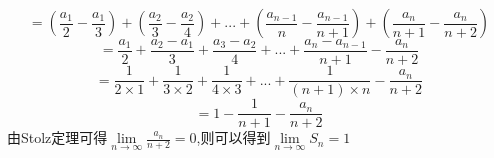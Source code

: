 \documentclass[UTF8,a4paper,10pt]{ctexart}
\begin{document}
\begin{flushleft}
\begin{enumerate}
				\begin{equation}
					=(\frac{a_{1}}{2}-\frac{a_{1}}{3})+(\frac{a_{2}}{3}-\frac{a_{2}}{4})+...+(\frac{a_{n-1}}{n}-\frac{a_{n-1}}{n+1})+(\frac{a_{n}}{n+1}-\frac{a_{n}}{n+2})\nonumber
				\end{equation}
				\begin{equation}
					=\frac{a_{1}}{2}+\frac{a_{2}-a_{1}}{3}+\frac{a_{3}-a_{2}}{4}+...+\frac{a_{n}-a_{n-1}}{n+1}-\frac{a_{n}}{n+2}\nonumber
				\end{equation}
				\begin{equation}
					=\frac{1}{2\times{1}}+\frac{1}{3\times{2}}+\frac{1}{4\times{3}}+...+\frac{1}{(n+1)\times{n}}-\frac{a_{n}}{n+2}\nonumber
				\end{equation}
				\begin{equation}
					=1-\frac{1}{n+1}-\frac{a_{n}}{n+2}\nonumber
				\end{equation}
				由Stolz定理可得$\lim\limits_{n\rightarrow\infty}\frac{a_{n}}{n+2}=0$,则可以得到$\lim\limits_{n\rightarrow\infty}S_{n}=1$
		\end{enumerate}
	\end{flushleft}
\end{document}
